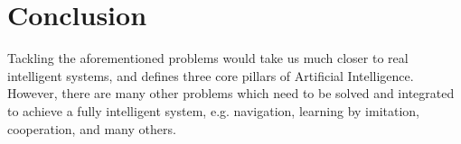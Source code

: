 \documentclass{article}
\begin{document}



\section{Conclusion}
\label{Sec:Con}

Tackling the aforementioned problems would take us much closer to
real intelligent systems, and defines three core pillars
of Artificial Intelligence. However, there are many other problems which
need to be solved and integrated to achieve a fully
intelligent system, e.g. navigation, learning by imitation, cooperation, and many others.


\end{document}

